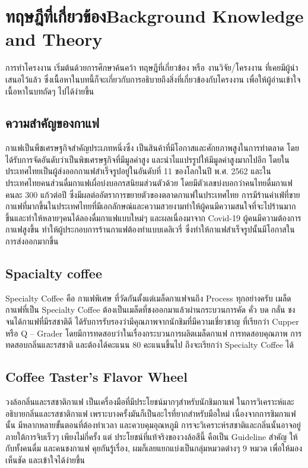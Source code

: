 \chapter{\ifcpe ทฤษฎีที่เกี่ยวข้อง\else Background Knowledge and Theory\fi}

การทำโครงงาน เริ่มต้นด้วยการศึกษาค้นคว้า ทฤษฎีที่เกี่ยวข้อง หรือ งานวิจัย/โครงงาน ที่เคยมีผู้นำเสนอไว้แล้ว ซึ่งเนื้อหาในบทนี้ก็จะเกี่ยวกับการอธิบายถึงสิ่งที่เกี่ยวข้องกับโครงงาน เพื่อให้ผู้อ่านเข้าใจเนื้อหาในบทถัดๆ ไปได้ง่ายขึ้น

\section{ความสำคัญของกาแฟ}
กาแฟเป็นพืชเศรษฐกิจสำคัญประเภทหนึ่งซึ่ง เป็นสินค้าที่มีโอกาสและศักยภาพสูงในการทำตลาด โดยได้รับการจัดอันดับว่าเป็นพิชเศรษฐกิจที่มีมูลค่าสูง และนำไแแปรรูปให้มีมูลค่าสูงมากไปอีก โดยในประเทศไทยเป็นผู้ส่งออกกาแฟสำเร็จรูปอยู่ในอันดับที่ 11 ของโลกในปี พ.ศ. 2562 และในประเทศไทยคนส่วนดื่มกาแฟเผื่อบ่งบอกรสนิยมส่วนตัวด้วย โดยมีตัวเลขบ่งบอกว่าคนไทยดื่มกาแฟคนละ 300 แก้วต่อปี ซึ่งมีผลต่ออัตราการขยายตัวของตลาดกาแฟในประเทศไทย การมีร้านค่าเฟ่ที่ขายกาแฟที่มากขึ้นในประเทศไทยที่มีเอกลักษณ์และความสวยงามทำให้ผู้คนมีความสนใจที่จะไปร้านมากขึ้นและทำให้หลายๆคนได้ลองดื่มกาแฟแบบใหม่ๆ และผลเนื่องมาจาก Covid-19 ผู้คนมีความต้องการกาแฟสูงขึ้น ทำให้ผู้ประกอบการร้านกาแฟต้องทำแบบเดลิเวรี่ ซึ่งทำให้กาแฟสำเร็จรูปนั้นมีโอกาสในการส่งออกมากขึ้น

\section{Spacialty coffee}
Specialty Coffee คือ กาแฟพิเศษ ที่วัดกันตั้งแต่เมล็ดกาแฟจนถึง Process ทุกอย่างครับ เมล็ดกาแฟที่เป็น Specialty Coffee ต้องเป็นเมล็ดที่ชงออกมาแล้วผ่านกระบวนการคัด คั่ว บด กลั่น ชง จนได้กาแฟที่มีรสชาติดี ได้รับการรับรองว่ามีคุณภาพจากนักชิมที่มีความเชี่ยวชาญ ที่เรียกว่า Cupper หรือ Q – Grader โดยมีการทดสอบว่าในเรื่องกระบวนการผลิตเมล็ดกาแฟ การทดสอบคุณภาพ การทดสอบกลิ่นและรสชาติ และต้องได้คะแนน 80 คะแนนขึ้นไป ถึงจะเรียกว่า Specialty Coffee ได้ \cite{special}

\section{Coffee Taster's Flavor Wheel}
วงล้อกลิ่นและรสชาติกาแฟ เป็นเครื่องมือที่มีประโยชน์มากๆสำหรับนักชิมกาแฟ ในการวิเคราะห์และอธิบายกลิ่นและรสชาติกาแฟ เพราะบางครั้งมันก็เป็นอะไรที่ยากสำหรับมือใหม่ เนื่องจากการชิมกาแฟนั้น มีหลากหลายขั้นตอนที่ต้องทำเวลา และควบคุมอุณหภูมิ การจะวิเคราะห์รสชาติและกลิ่นนั้นอาจอยู่ภายใต้การจิบเร็วๆ เพียงไม่กี่ครั้ง แต่ ประโยชน์ที่แท้จริงของวงล้อสีนี้ คือเป็น Guideline สำคัญ ให้กับทั้งคนดื่ม และคนชงกาแฟ คุยกันรู้เรื่อง, ผมก็เลยแยกแบ่งเป็นกลุ่มหมวดต่างๆ 9 หมวด เพื่อให้มองเห็นชัด และเข้าใจได้ง่ายขึ้น \cite{wheel}

